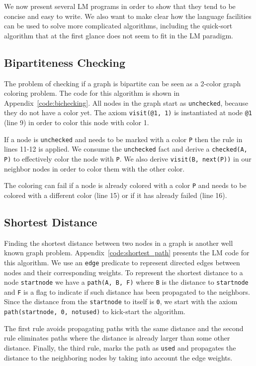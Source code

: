 
We now present several LM programs in order to show that they tend to be concise and
easy to write. We also want to make clear how the language facilities can be used to solve more
complicated algorithms, including the quick-sort algorithm that at the first glance does not seem
to fit in the LM paradigm.

\subsection{Bipartiteness Checking}

The problem of checking if a graph is bipartite can be seen as a 2-color graph coloring problem.
The code for this algorithm is shown in Appendix~\ref{code:bichecking}. All nodes in the graph
start as \texttt{unchecked}, because they do not have a color yet. The axiom \texttt{visit(@1, 1)} is
instantiated at node \texttt{@1} (line 9) in order to color this node with color 1.

If a node is \texttt{unchecked} and needs to be marked with a color \texttt{P} then the rule in
lines 11-12 is applied. We consume the \texttt{unchecked} fact and derive a \texttt{checked(A, P)}
to effectively color the node with \texttt{P}. We also derive \texttt{visit(B, next(P))} in
our neighbor nodes in order to color them with the other color.

The coloring can fail if a node is already colored with a color \texttt{P} and needs to be colored
with a different color (line 15) or if it has already failed (line 16).

\subsection{Shortest Distance}

Finding the shortest distance between two nodes in a graph is another well known graph problem.
Appendix~\ref{code:shortest_path} presents the LM code for this algorithm. We use an \texttt{edge}
predicate to represent directed edges between nodes and their corresponding weights. To represent the shortest
distance to a node \texttt{startnode} we have a \texttt{path(A, B, F)} where \texttt{B} is the distance to \texttt{startnode}
and \texttt{F} is a flag to indicate if such distance has been propagated to the neighbors. Since the distance from
the \texttt{startnode} to itself is \texttt{0}, we start with the axiom \texttt{path(startnode, 0, notused)} to kick-start
the algorithm.

The first rule avoids propagating paths with the same distance and the second rule eliminates paths where the distance
is already larger than some other distance. Finally, the third rule, marks the path as \texttt{used} and propagates
the distance to the neighboring nodes by taking into account the edge weights.

